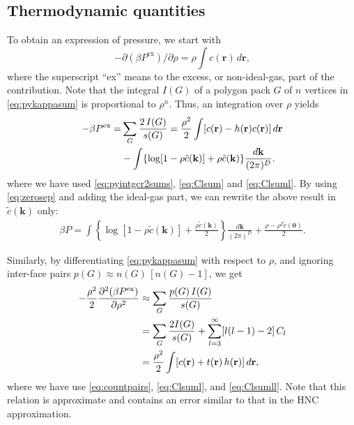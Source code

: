 \documentclass[notitlepage,preprint]{revtex4-1}
\newcommand{\vct}[1]{\mathbf{#1}}
\providecommand{\vr}{} %
\renewcommand{\vr}{\vct{r}}
\newcommand{\vk}{\vct{k}}
\newcommand{\dvk}{\frac{d\vk}{(2\pi)^D}}
\newcommand{\supex}[1]{ { { #1 }^{ \mathrm{ex} } } }
\newcommand{\Pex}{\supex{P}}
\begin{document}
\subsection*{Thermodynamic quantities}


%
To obtain an expression of pressure,
  we start with\cite{hansen}
%
\begin{equation}
  -\partial (\beta P^{\mathrm{ex}}) / \partial \rho
  = \rho \int c(\vr) \, d\vr,
\label{eq:crcompr}
\end{equation}
%
where the superscript ``ex'' means to the excess, or non-ideal-gas, part of the contribution.
%
Note that
  the integral $I(G)$ of a polygon pack $G$ of $n$ vertices
  in \eqref{eq:pykappasum}
  is proportional to $\rho^n$.
%
Thus, an integration over $\rho$ yields\cite{baxterpressure}
%
\begin{align}
      -\beta \Pex
  =&  \sum_{G} \frac{ 2 \, I(G) }{ s(G) }
  =   \frac{ \rho^2 }{ 2 }
      \int [c(\vr) - h(\vr) c(\vr)] \, d\vr \notag \\
  &
      -\int \{ \log[1 - \rho \tilde{c}(\vk)] + \rho \tilde{c}(\vk) \} \dvk.
\label{eq:baxterpressure}
\end{align}
%
where we have used
\eqref{eq:pyintgcr2sums}, \eqref{eq:Clsum} and \eqref{eq:Clsuml}.
%
By using \eqref{eq:zerosep} and adding the ideal-gas part, 
  we can rewrite the above result in $\tilde{c}(\vk)$ only:
%
\begin{align*}
      \beta P
    =
      \int \left\{
            \log[1 - \rho \tilde{c}(\vk)]
            + \frac{\rho \tilde{c}(\vk)}{2}
           \right\} \dvk
     +\frac{ \rho - \rho^2 \tilde{c}(\vct0) }{2}.
\end{align*}
  

Similarly,
  by differentiating \eqref{eq:pykappasum} with respect to $\rho$,
  and ignoring inter-face pairs $p(G) \approx n(G) \, [n(G) - 1]$,
  we get
%
\begin{align}
           -\frac{\rho^2}{2}
            \frac{\partial^2 ( \beta \Pex ) }
                 {\partial \rho^2}
  &\approx   \sum_G \frac{ p(G) \, I(G) }{ s(G) }
    \notag \\
  &=
            \sum_G \frac{2 I(G) }{s(G)}
            + \sum_{l = 3}^\infty [l(l-1) - 2] \, C_l
    \notag \\
  &=         \frac{\rho^2}{2} \int [c(\vr) + t(\vr) \, h(\vr) ] \, d\vr,
\label{eq:pyddpressure}
\end{align}
%
where we have use \eqref{eq:countpairs}, \eqref{eq:Clsuml}, and \eqref{eq:Clsumll}.
%
Note that this relation is approximate
  and contains an error
  similar to that in the HNC approximation.
\end{document}
